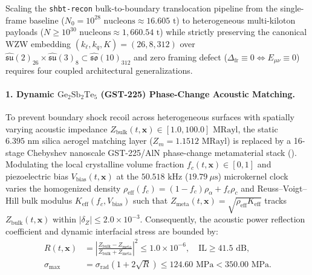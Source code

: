 \documentclass[11pt,onecolumn]{article}
\begin{document}
Scaling the \texttt{shbt-recon} bulk-to-boundary translocation pipeline from the single-frame baseline ($N_0 = 10^{28}\text{ nucleons} \approx 16.605\text{ t}$) to heterogeneous multi-kiloton payloads ($N \ge 10^{30}\text{ nucleons} \approx 1{,}660.54\text{ t}$) while strictly preserving the canonical WZW embedding $(k_\ell, k_q, K) = (26, 8, 312)$ over $\widehat{\mathfrak{su}}(2)_{26} \times \widehat{\mathfrak{su}}(3)_8 \subset \widehat{\mathfrak{so}}(10)_{312}$ and zero framing defect ($\Delta_{\text{fr}} \equiv 0 \iff E_{\mu\nu} \equiv 0$) requires four coupled architectural generalizations.

\paragraph{1. Dynamic $\text{Ge}_2\text{Sb}_2\text{Te}_5$ (GST-225) Phase-Change Acoustic Matching.}
To prevent boundary shock recoil across heterogeneous surfaces with spatially varying acoustic impedance $Z_{\text{bulk}}(t,\mathbf{x}) \in [1.0, 100.0]\text{ MRayl}$, the static $6.395\text{ nm}$ silica aerogel matching layer ($Z_m = 1.1512\text{ MRayl}$) is replaced by a 16-stage Chebyshev nanoscale GST-225/AlN phase-change metamaterial stack (). Modulating the local crystalline volume fraction $f_c(t,\mathbf{x}) \in [0,1]$ and piezoelectric bias $V_{\text{bias}}(t,\mathbf{x})$ at the $50.518\text{ kHz}$ ($19.79\ \mu\text{s}$) microkernel clock varies the homogenized density $\rho_{\text{eff}}(f_c) = (1-f_c)\rho_\alpha + f_c\rho_c$ and Reuss--Voigt--Hill bulk modulus $K_{\text{eff}}(f_c, V_{\text{bias}})$ such that $Z_{\text{meta}}(t,\mathbf{x}) = \sqrt{\rho_{\text{eff}} K_{\text{eff}}}$ tracks $Z_{\text{bulk}}(t,\mathbf{x})$ within $|\delta_Z| \le 2.0 \times 10^{-3}$. Consequently, the acoustic power reflection coefficient and dynamic interfacial stress are bounded by:
\begin{align}
  R(t,\mathbf{x}) &= \left|\frac{Z_{\text{bulk}} - Z_{\text{meta}}}{Z_{\text{bulk}} + Z_{\text{meta}}}\right|^2 \le 1.0 \times 10^{-6}, \quad \text{IL} \ge 41.5\text{ dB}, \label{eq:gst_trans} \\
  \sigma_{\max} &= \sigma_{\text{rad}}\left(1 + 2\sqrt{R}\right) \le 124.60\text{ MPa} < 350.00\text{ MPa}. \label{eq:gst_atten}
\end{align}
\end{document}
